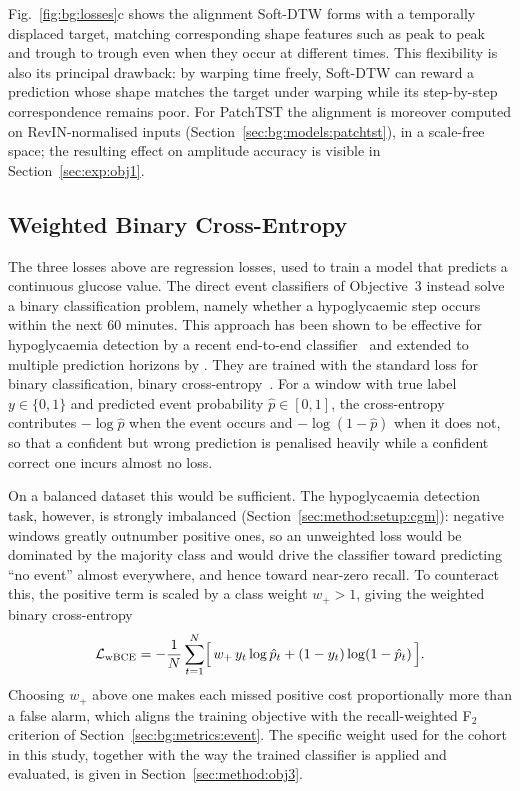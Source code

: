 Fig.~\ref{fig:bg:losses}c shows the alignment Soft-DTW forms with a temporally displaced target, matching corresponding shape features such as peak to peak and trough to trough even when they occur at different times. This flexibility is also its principal drawback: by warping time freely, Soft-DTW can reward a prediction whose shape matches the target under warping while its step-by-step correspondence remains poor. For PatchTST the alignment is moreover computed on RevIN-normalised inputs (Section~\ref{sec:bg:models:patchtst}), in a scale-free space; the resulting effect on amplitude accuracy is visible in Section~\ref{sec:exp:obj1}.


\subsection{Weighted Binary Cross-Entropy} \label{sec:bg:losses:bce}

The three losses above are regression losses, used to train a model that predicts a continuous glucose value. The direct event classifiers of Objective~3 instead solve a binary classification problem, namely whether a hypoglycaemic step occurs within the next 60 minutes. This approach has been shown to be effective for hypoglycaemia detection by a recent end-to-end classifier~\citep{shao2024hypoglycemia} and extended to multiple prediction horizons by \citet{cinar2025hypoclassification}. They are trained with the standard loss for binary classification, binary cross-entropy~\citep{goodfellow2016deeplearning}. For a window with true label $y \in \{0, 1\}$ and predicted event probability $\hat{p} \in [0, 1]$, the cross-entropy contributes $-\log \hat{p}$ when the event occurs and $-\log(1 - \hat{p})$ when it does not, so that a confident but wrong prediction is penalised heavily while a confident correct one incurs almost no loss.

On a balanced dataset this would be sufficient. The hypoglycaemia detection task, however, is strongly imbalanced (Section~\ref{sec:method:setup:cgm}): negative windows greatly outnumber positive ones, so an unweighted loss would be dominated by the majority class and would drive the classifier toward predicting ``no event'' almost everywhere, and hence toward near-zero recall. To counteract this, the positive term is scaled by a class weight $w_{+} > 1$, giving the weighted binary cross-entropy
\begin{equation}
    \mathcal{L}_\text{wBCE} = -\frac{1}{N}\sum_{t=1}^{N} \Bigl[\, w_{+}\, y_t \log \hat{p}_t + (1 - y_t)\log(1 - \hat{p}_t) \,\Bigr].
    \label{eq:wbce}
\end{equation}
Choosing $w_{+}$ above one makes each missed positive cost proportionally more than a false alarm, which aligns the training objective with the recall-weighted F$_2$ criterion of Section~\ref{sec:bg:metrics:event}. The specific weight used for the cohort in this study, together with the way the trained classifier is applied and evaluated, is given in Section~\ref{sec:method:obj3}.

